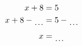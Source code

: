 \documentclass[varwidth]{standalone}
\begin{document}
    \begin{varwidth}{0.25\paperwidth}
    \begin{align*}
    x + 8 &= 5\\
    x + 8 - \dotuline{\hspace{4mm}} &= 5 - \dotuline{\hspace{4mm}}\\
    x &= \dotuline{\hspace{4mm}}\\
\end{align*}
\end{varwidth}
\end{document}
